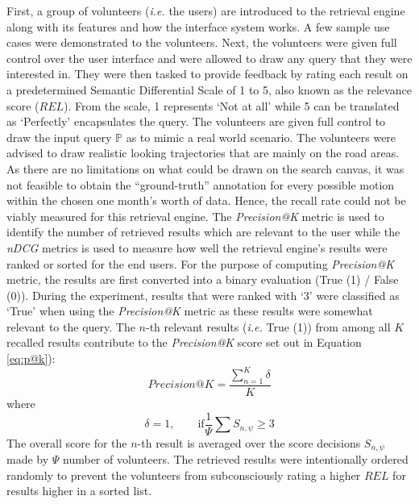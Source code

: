 First, a group of volunteers (\emph{i.e.} the users) are introduced to the retrieval engine along with its features and how the interface system works. A few sample use cases were demonstrated to the volunteers. 
Next, the volunteers were given full control over the user interface and were allowed to draw any query that they were interested in. They were then tasked to provide feedback by rating each result on a predetermined Semantic Differential Scale of 1 to 5,
also known as the relevance score ($REL$). 
From the scale, 1 represents `Not at all' while 5 can be translated as `Perfectly' encapsulates the query.
The volunteers are given full control to draw the input query $\mathbb{P}$ as to mimic a real world scenario. The volunteers were advised to draw realistic looking trajectories that are mainly on the road areas. As there are no limitations on what could be drawn on the search canvas, it was not feasible to  obtain the ``ground-truth'' annotation for every possible motion within the chosen one month's worth of data. 
Hence, the recall rate could not be viably measured for this retrieval engine. 
The \textit{Precision@K} metric is used to identify the number of retrieved results which are relevant to the user while the \textit{nDCG} metrics is used to measure how well the retrieval engine's results were ranked or sorted for the end users.
For the purpose of computing \textit{Precision@K} metric, the results are first converted into a binary evaluation (True (1) / False (0)).  
During the experiment, results that were ranked with `3' were classified as `True' when using the \textit{Precision@K} metric as these results were somewhat relevant to the query.
The $n$-th relevant results (\emph{i.e.} True (1)) from among all $K$ recalled results contribute to the
\textit{Precision@K} score set out in Equation \ref{eq:p@k}):
\begin{equation}
\label{eq:p@k}
Precision@K =  \frac{\sum_{n=1}^K \delta}{K}
\end{equation}
where 
\begin{equation}
\delta=1, \qquad \text{if} \frac{1}{\Psi}\sum S_{n,\psi} \geq 3
\end{equation}
The overall score for the $n$-th result is averaged over the score decisions $S_{n,\psi}$ made by $\Psi$ number of volunteers.
The retrieved results were intentionally ordered randomly to prevent the volunteers from subconsciously rating a higher $REL$ for results higher in a sorted list.


